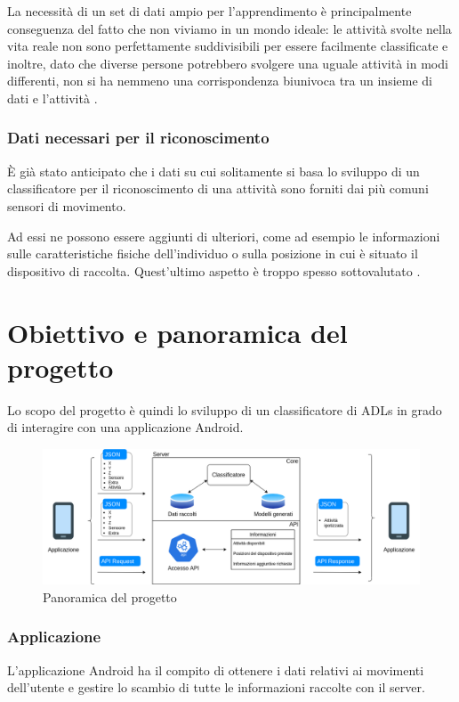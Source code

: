 La necessità di un set di dati ampio per l'apprendimento è principalmente conseguenza del fatto che non viviamo in un mondo ideale: 
le attività svolte nella vita reale non sono perfettamente suddivisibili per essere facilmente classificate e inoltre, dato che diverse persone
potrebbero svolgere una uguale attività in modi differenti, non si ha nemmeno una corrispondenza biunivoca tra un insieme di dati e l'attività \cite{framework_long_term_data_har}.

\subsubsection{Dati necessari per il riconoscimento}
È già stato anticipato che i dati su cui solitamente si basa lo sviluppo di un classificatore per il riconoscimento di una attività sono forniti dai 
più comuni sensori di movimento.

Ad essi ne possono essere aggiunti di ulteriori, come ad esempio le informazioni sulle caratteristiche fisiche
dell'individuo o sulla posizione in cui è situato il dispositivo di raccolta.
Quest'ultimo aspetto è troppo spesso sottovalutato \cite{umafall}.

\section{Obiettivo e panoramica del progetto}
Lo scopo del progetto è quindi lo sviluppo di un classificatore di ADLs in grado di interagire con una applicazione
Android.

\begin{figure}[H]
    \centering
    \includegraphics[scale = 0.41]{assets/images/overview.png}
    \caption{Panoramica del progetto}
\end{figure}

\subsubsection{Applicazione}
L'applicazione Android ha il compito di ottenere i dati relativi ai movimenti dell'utente 
e gestire lo scambio di tutte le informazioni raccolte con il server.
